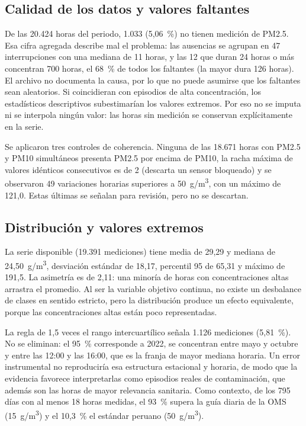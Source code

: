 
\subsection{Calidad de los datos y valores faltantes}
\label{sec:faltantes}

De las 20.424 horas del periodo, 1.033 (5,06~\%) no tienen medición de PM2.5. Esa cifra agregada describe mal el problema: las ausencias se agrupan en 47 interrupciones con una mediana de 11 horas, y las 12 que duran 24 horas o más concentran 700 horas, el 68~\% de todos los faltantes (la mayor dura 126 horas). El archivo no documenta la causa, por lo que no puede asumirse que los faltantes sean aleatorios. Si coincidieran con episodios de alta concentración, los estadísticos descriptivos subestimarían los valores extremos. Por eso no se imputa ni se interpola ningún valor: las horas sin medición se conservan explícitamente en la serie.

Se aplicaron tres controles de coherencia. Ninguna de las 18.671 horas con PM2.5 y PM10 simultáneos presenta PM2.5 por encima de PM10, la racha máxima de valores idénticos consecutivos es de 2 (descarta un sensor bloqueado) y se observaron 49 variaciones horarias superiores a 50~\textmu g/m\textsuperscript{3}, con un máximo de 121,0. Estas últimas se señalan para revisión, pero no se descartan.

\subsection{Distribución y valores extremos}
\label{sec:distribucion}

La serie disponible (19.391 mediciones) tiene media de 29,29 y mediana de 24,50~\textmu g/m\textsuperscript{3}, desviación estándar de 18,17, percentil 95 de 65,31 y máximo de 191,5. La asimetría es de 2,11: una minoría de horas con concentraciones altas arrastra el promedio. Al ser la variable objetivo continua, no existe un desbalance de clases en sentido estricto, pero la distribución produce un efecto equivalente, porque las concentraciones altas están poco representadas.

La regla de 1,5 veces el rango intercuartílico señala 1.126 mediciones (5,81~\%). No se eliminan: el 95~\% corresponde a 2022, se concentran entre mayo y octubre y entre las 12:00 y las 16:00, que es la franja de mayor mediana horaria. Un error instrumental no reproduciría esa estructura estacional y horaria, de modo que la evidencia favorece interpretarlas como episodios reales de contaminación, que además son las horas de mayor relevancia sanitaria. Como contexto, de los 795 días con al menos 18 horas medidas, el 93~\% supera la guía diaria de la OMS (15~\textmu g/m\textsuperscript{3}) y el 10,3~\% el estándar peruano (50~\textmu g/m\textsuperscript{3}).

